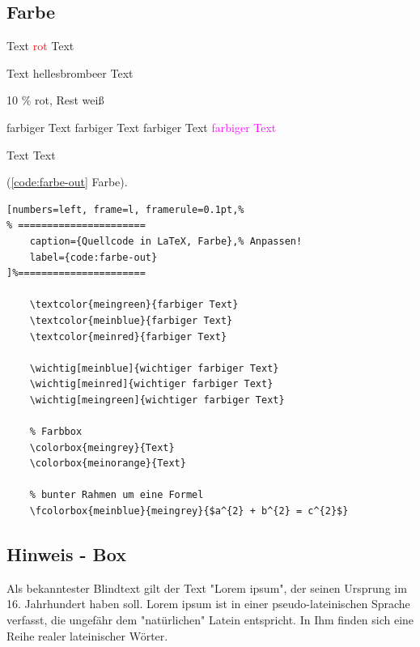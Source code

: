 \newpage %

\subsection{Farbe}

Text \textcolor{red}{rot} Text

Text \colorbox{hellesbrombeer}{hellesbrombeer} Text

\colorbox{red!10!white}{10 \% rot, Rest weiß}

\textcolor{meinorange}{farbiger Text}
\textcolor{meinblue}{farbiger Text}
\textcolor{meinred}{farbiger Text}
\textcolor{magenta}{farbiger Text}


\colorbox{meingrey}{Text}
\colorbox{meinorange}{Text}


(\autoref{code:farbe-out} Farbe).
\lstset{language=[LaTeX]TeX} %
\begin{lstlisting}[numbers=left, frame=l, framerule=0.1pt,%
% ======================
	caption={Quellcode in LaTeX, Farbe},% Anpassen!
	label={code:farbe-out}
]%======================

	\textcolor{meingreen}{farbiger Text}
	\textcolor{meinblue}{farbiger Text}
	\textcolor{meinred}{farbiger Text}

	\wichtig[meinblue]{wichtiger farbiger Text}
	\wichtig[meinred]{wichtiger farbiger Text}
	\wichtig[meingreen]{wichtiger farbiger Text}

	% Farbbox
	\colorbox{meingrey}{Text}
	\colorbox{meinorange}{Text}

	% bunter Rahmen um eine Formel
	\fcolorbox{meinblue}{meingrey}{$a^{2} + b^{2} = c^{2}$}
\end{lstlisting}

\subsection{Hinweis - Box}

\begin{hinweis}\label{sec:hinweis}
  Als bekanntester Blindtext gilt der Text "Lorem ipsum", der seinen Ursprung im 16. Jahrhundert haben soll.
  Lorem ipsum ist in einer pseudo-lateinischen Sprache verfasst, die ungefähr dem "natürlichen" Latein entspricht.
  In Ihm finden sich eine Reihe realer lateinischer Wörter.
\end{hinweis}

